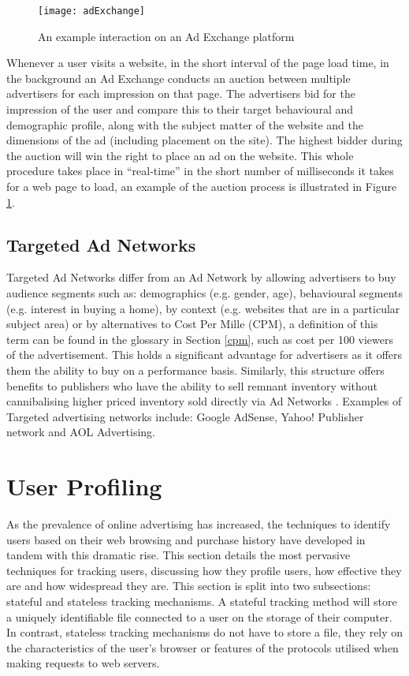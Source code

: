 \documentclass[12pt]{article}
\begin{document}
\begin{figure}[H]
    \centering
    \texttt{[image: adExchange]}
    \caption{An example interaction on an Ad Exchange platform \parencite{adExchanges}}
    \label{fig:adExchange}
\end{figure}

Whenever a user visits a website, in the short interval of the page load time, in the background an Ad Exchange conducts an auction between multiple advertisers for each impression on that page. The advertisers bid for the impression of the user and compare this to their target behavioural and demographic profile, along with the subject matter of the website and the dimensions of the ad (including placement on the site). The highest bidder during the auction will win the right to place an ad on the website. This whole procedure takes place in ``real-time'' in the short number of milliseconds it takes for a web page to load, an example of the auction process is illustrated in Figure \ref{fig:adExchange}. 

\subsection{ Targeted Ad Networks}
Targeted Ad Networks differ from an Ad Network by allowing advertisers to buy audience segments such as: demographics (e.g. gender, age),  behavioural segments (e.g. interest in buying a home), by context (e.g. websites that are in a particular subject area) or by alternatives to Cost Per Mille (CPM), a definition of this term can be found in the glossary in Section \ref{cpm}, such as cost per 100 viewers of the advertisement. This holds a significant advantage for advertisers as it offers them the ability to buy on a performance basis. Similarly, this structure offers benefits to publishers who have the ability to sell remnant inventory without cannibalising higher priced inventory sold directly via Ad Networks \parencite{adExchanges}. Examples of Targeted advertising networks include: Google AdSense, Yahoo! Publisher network and AOL Advertising.

\pagebreak

\section{User Profiling} \label{userProfiling}
As the prevalence of online advertising has increased, the techniques to identify users based on their web browsing and purchase history have developed in tandem with this dramatic rise. This section details the most pervasive techniques for tracking users, discussing how they profile users, how effective they are and how widespread they are. This section is split into two subsections: stateful and stateless tracking mechanisms. A stateful tracking method will store a uniquely identifiable file connected to a user on the storage of their computer. In contrast, stateless tracking mechanisms do not have to store a file, they rely on the characteristics of the user's browser or features of the protocols utilised when making requests to web servers.
\end{document}
